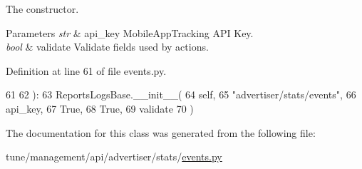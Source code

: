 The constructor. 


\begin{DoxyParams}{Parameters}
{\em str} & api\-\_\-key Mobile\-App\-Tracking A\-P\-I Key. \\
\hline
{\em bool} & validate Validate fields used by actions. \\
\hline
\end{DoxyParams}


Definition at line 61 of file events.\-py.


\begin{DoxyCode}
61 
62         ):
63         ReportsLogsBase.\_\_init\_\_(
64             self,
65             \textcolor{stringliteral}{"advertiser/stats/events"},
66             api\_key,
67             \textcolor{keyword}{True},
68             \textcolor{keyword}{True},
69             validate
70         )
\end{DoxyCode}


The documentation for this class was generated from the following file\-:\begin{DoxyCompactItemize}
\item 
tune/management/api/advertiser/stats/\hyperlink{events_8py}{events.\-py}\end{DoxyCompactItemize}
